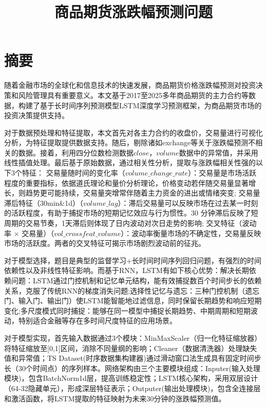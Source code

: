 \documentclass[a4paper,11pt]{ctexart}
\title{商品期货涨跌幅预测问题}
\date{}
\begin{document}
\maketitle
 

 
\section{摘要}
随着金融市场的全球化和信息技术的快速发展，商品期货价格涨跌幅预测对投资决策和风险管理具有重要意义。本文基于2017至2025多年商品期货的主力合约等数据，构建了基于长时间序列预测模型LSTM深度学习预测框架，为商品期货市场的投资决策提供支持。

对于数据预处理和特征提取，本文首先对各主力合约的收盘价，交易量进行可视化分析，为特征提取提供数据支持。随后，剔除诸如exchange等关于涨跌幅预测不相关的数据。接着，利用四分位数检测数据${close}$，${volume}$数据中的异常值，并采用线性插值处理。最后基于原始数据，通过相关性分析，提取与涨跌幅相关性强的以下3个特征：
交易量随时间的变化率（${volume\_change\_rate}$）：交易量是市场活跃程度的重要指标，依据道氏理论和量价分析理论，价格变动若伴随交易量显著增长，则趋势更可能持续，交易量突增常伴随着主力资金的进出或情绪突变;
交易量滞后特征（30min\&1d）（${volume\_lag}$）：滞后交易量可以反映市场在过去某一时刻的活跃程度，有助于捕捉市场的短期记忆效应与行为惯性。30 分钟滞后反映了短周期的交易节奏，1天滞后则体现了日内波动对次日走势的影响;
交叉特征（波动率 × 交易量）（${vol\_crossfeat\_volume}$）：波动率衡量市场的不确定性，交易量反映市场的活跃度。两者的交叉特征可揭示市场剧烈波动前的征兆。

对于模型选择，题目是典型的监督学习+长时间时间序列回归问题，有强烈的时间依赖性以及非线性特征影响。而基于RNN，LSTM有如下核心优势：解决长期依赖问题：LSTM通过门控机制和记忆单元结构，能有效捕捉数百个时间步长的依赖关系，克服了传统RNN的梯度消失问题;选择性记忆与遗忘：三种门控机制（遗忘门、输入门、输出门）使LSTM能智能地过滤信息，同时保留长期趋势和响应短期变化;多尺度模式同时捕捉：能够在同一模型中捕捉长期趋势、中期周期和短期波动，特别适合金融等存在多时间尺度特征的应用场景。

对于模型实现，首先输入数据通过3个模块：MinMaxScaler（归一化特征缩放器）将特征缩放至[0,1]区间，消除不同量纲的影响；Cleaner（数据清洗器）处理缺失值和异常值；TS Dataset(时序数据集构建器)通过滑动窗口法生成具有固定时间步长（30个时间点）的序列样本。网络架构由三个主要模块组成：Inputer(输入处理模块)，包含BatchNorm1d层，提高训练稳定性；LSTM核心架构，采用双层设计（64-32隐藏单元），形成深层特征表示；Outputer(输出处理模块)，包含全连接层和激活函数，将LSTM提取的特征映射为未来30分钟的涨跌幅预测值。
\end{document}
